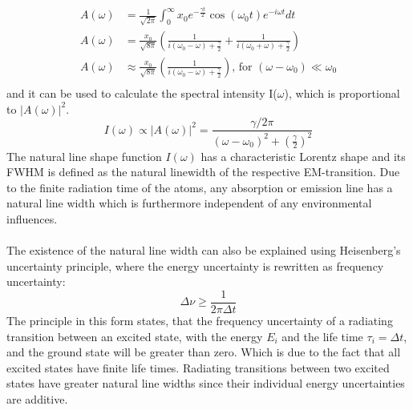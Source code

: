 \begin{align}
A(\omega) &=\frac{1}{\sqrt{2\pi}}\int_{0}^{\infty}x_0 e^{-\frac{\gamma t}{2}} \cos(\omega_0 t) e^{-i\omega t} dt \nonumber \\
A(\omega) &=\frac{x_0}{\sqrt{8\pi}}\left(\frac{1}{i(\omega_0-\omega)+\frac{\gamma}{2}}+\frac{1}{i(\omega_0+\omega)+\frac{\gamma}{2}}\right) \nonumber\\
A(\omega) &\approx\frac{x_0}{\sqrt{8\pi}}\left(\frac{1}{i(\omega_0-\omega)+\frac{\gamma}{2}}\right) \text{, for }  (\omega-\omega_0) \ll \omega_0 \\
\label{Fouriertransformation_a(omega)}\nonumber
\end{align}
and it can be used to calculate the spectral intensity I($\omega$), which is proportional to $|A(\omega)|^2$.
\begin{equation}
I(\omega) \propto |A(\omega)|^2 = \frac{\gamma/2\pi}{(\omega-\omega_0)^2+(\frac{\gamma}{2})^2}
\label{Intensitaet_}
\end{equation}
The natural line shape function $I(\omega)$ has a characteristic Lorentz shape and its FWHM is defined as the natural linewidth of the respective EM-transition. Due to the finite radiation time of the atoms, any absorption or emission line has a natural line width which is furthermore independent of any environmental influences. \\ \\ The existence of the natural line width can also be explained using Heisenberg's uncertainty principle, where the energy uncertainty is rewritten as frequency uncertainty: 
\begin{equation}
 \Delta \nu \geq \frac{1}{2 \pi \Delta t}
\label{Heisenberg_unscharfe}
\end{equation}
The principle in this form states, that the frequency uncertainty of a radiating transition between an excited state, with the energy $E_i$ and the life time $\tau_i= \Delta t$,  and the ground state will be greater than zero. Which is due to the fact that all excited states have finite life times. Radiating transitions between two excited states have greater natural line widths since their individual energy uncertainties are additive.



